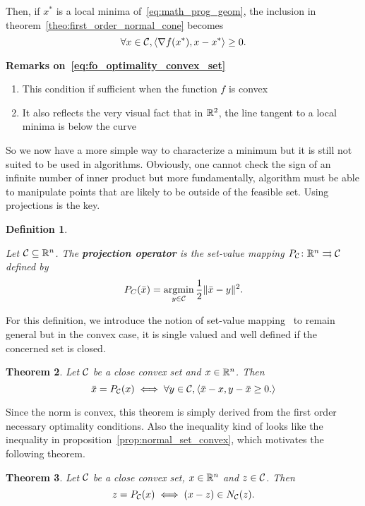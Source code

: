 \documentclass[10pt]{article}
\newtheorem{theorem}{Theorem}[]
\newtheorem{definition}[theorem]{Definition}
\numberwithin{equation}{section}
\begin{document}
	Then, if $x^*$ is a local minima of~\eqref{eq:math_prog_geom}, the inclusion in theorem~\ref{theo:first_order_normal_cone}  becomes
	\begin{equation}\label{eq:fo_optimality_convex_set}
		\forall x \in {\mathcal{C}}, \left\langle {\nabla f(x^*)} , {x-x^*} \right\rangle \ge 0.
	\end{equation}
	
	\textbf{Remarks on~\eqref{eq:fo_optimality_convex_set}}
	\begin{enumerate}
		\item This condition if sufficient when the function $f$ is convex
		\item It also reflects the very visual fact that in ${\mathbb{R}}^2$, the line tangent to a local minima is below the curve
	\end{enumerate}
	
	So we now have a more simple way to characterize a minimum but it is still not suited to be used in algorithms. Obviously, one cannot check the sign of an infinite number of inner product but more fundamentally, algorithm must be able to manipulate points that are likely to be outside of the feasible set. Using projections is the key.
	
	\begin{definition}\label{def:projection}
		
		Let ${\mathcal{C}} \subseteq {\mathbb{R}}^n$. The \textbf{projection operator} is the set-value mapping $P_{\mathcal{C}} \colon {\mathbb{R}}^n \rightrightarrows {\mathcal{C}} $ defined by
		\[ P_C(\bar{x}) = \operatorname*{argmin}_{y \in {\mathcal{C}}}  \dfrac{1}{2} \|\bar{x}-y\|^2.\]
	\end{definition}
	
	For this definition, we introduce the notion of set-value mapping~\cite{rockafellarwets:1998} to remain general but in the convex case, it is single valued and well defined if the concerned set is closed. 
	
	\begin{theorem}
		Let ${\mathcal{C}}$ be a close convex set and $x \in {\mathbb{R}}^n$. Then
		\[\bar{x} = P_{\mathcal{C}}(x) \iff \forall y \in {\mathcal{C}}, \left\langle {\bar{x}-x} , {y-\bar{x} \ge 0.} \right\rangle\]
	\end{theorem}
	
	Since the norm is convex, this theorem is simply derived from the first order necessary optimality  conditions. Also the inequality kind of looks like the inequality in proposition~\eqref{prop:normal_set_convex}, which motivates the following theorem.
	
	\begin{theorem}
		Let ${\mathcal{C}}$ be a close convex set, $x \in {\mathbb{R}}^n$ and $z \in {\mathcal{C}}$. Then
		\[z = P_{\mathcal{C}}(x) \iff (x-z) \in N_{\mathcal{C}}(z).\]
	\end{theorem}
	
\end{document}
